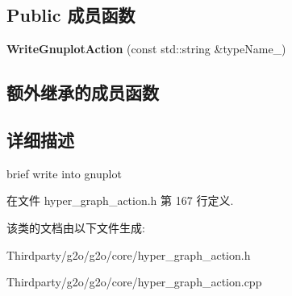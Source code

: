 \subsection*{Public 成员函数}
\begin{DoxyCompactItemize}
\item 
\hypertarget{classg2o_1_1WriteGnuplotAction_abfae045b16ae760f6d0c7feefe4b751f}{{\bfseries Write\-Gnuplot\-Action} (const std\-::string \&type\-Name\-\_\-)}\label{classg2o_1_1WriteGnuplotAction_abfae045b16ae760f6d0c7feefe4b751f}

\end{DoxyCompactItemize}
\subsection*{额外继承的成员函数}


\subsection{详细描述}
brief write into gnuplot 

在文件 hyper\-\_\-graph\-\_\-action.\-h 第 167 行定义.



该类的文档由以下文件生成\-:\begin{DoxyCompactItemize}
\item 
Thirdparty/g2o/g2o/core/hyper\-\_\-graph\-\_\-action.\-h\item 
Thirdparty/g2o/g2o/core/hyper\-\_\-graph\-\_\-action.\-cpp\end{DoxyCompactItemize}
